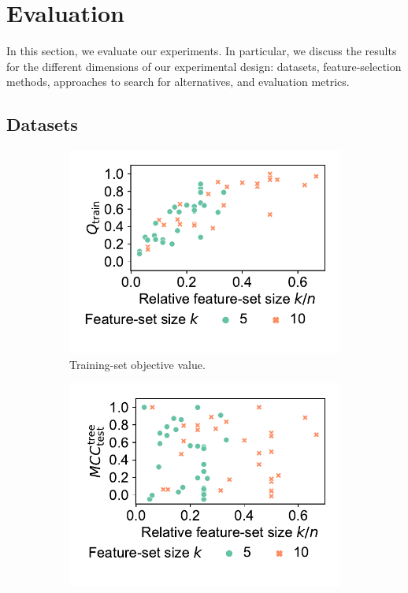 \documentclass{article}
\theoremstyle{definition}
\begin{document}
\section{Evaluation}
\label{sec:afs:evaluation}

In this section, we evaluate our experiments.
In particular, we discuss the results for the different dimensions of our experimental design:
datasets, feature-selection methods, approaches to search for alternatives, and evaluation metrics.

\subsection{Datasets}
\label{sec:afs:evaluation:datasets}

\begin{figure}[htb]
	\centering
	\begin{subfigure}[t]{0.48\textwidth}
		\centering
		\includegraphics[width=\textwidth, trim=15 30 15 15, clip]{plots/afs-impact-dataset-k-train-objective.pdf}
		\caption{Training-set objective value.}
		\label{fig:afs:impact-dataset-k-train-objective}
	\end{subfigure}
	\hfill
	\begin{subfigure}[t]{0.48\textwidth}
		\centering
		\includegraphics[width=\textwidth, trim=15 30 15 15, clip]{plots/afs-impact-dataset-k-decision-tree-test-mcc.pdf}

\end{subfigure}
\end{figure}
\end{document}
